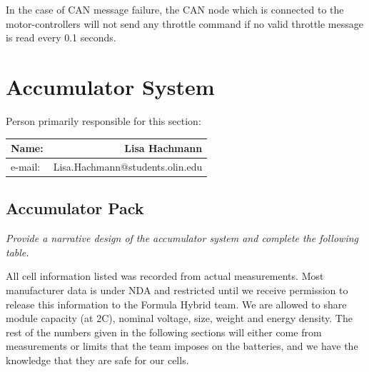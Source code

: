 \documentclass{article}
\begin{document}
    \textnormal{In the case of CAN message failure, the CAN node which is connected to the motor-controllers will not send any throttle command if no valid throttle message is read every 0.1 seconds.}


\section{Accumulator System}

        Person primarily responsible for this section:

            \begin{table}[H]
                \centering
                \label{responsible5}
                \begin{tabular}{lr}
                Name: & Lisa Hachmann \\ \hline
                e-mail: & Lisa.Hachmann@students.olin.edu \\ \hline
                \end{tabular}
            \end{table}

    \subsection{Accumulator Pack}

        \textit{Provide a narrative design of the accumulator system and complete the following table.}

        All cell information listed was recorded from actual measurements. Most manufacturer data is under NDA and restricted until we receive permission to release this information to the Formula Hybrid team. We are allowed to share module capacity (at 2C), nominal voltage, size, weight and energy density. The rest of the numbers given in the following sections will either come from measurements or limits that the team imposes on the batteries, and we have the knowledge that they are safe for our cells.
\end{document}
